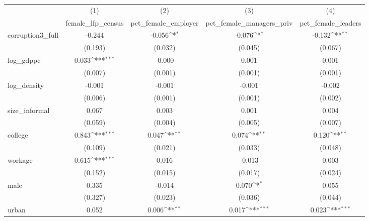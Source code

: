 {
\def\sym#1{\ifmmode^{#1}\else\(^{#1}\)\fi}
\begin{tabular}{l*{4}{c}}
\hline\hline
            &\multicolumn{1}{c}{(1)}&\multicolumn{1}{c}{(2)}&\multicolumn{1}{c}{(3)}&\multicolumn{1}{c}{(4)}\\
            &\multicolumn{1}{c}{female\_lfp\_census}&\multicolumn{1}{c}{pct\_female\_employer}&\multicolumn{1}{c}{pct\_female\_managers\_priv}&\multicolumn{1}{c}{pct\_female\_leaders}\\
\hline
corruption3\_full&      -0.244         &      -0.056\sym{*}  &      -0.076\sym{*}  &      -0.132\sym{**} \\
            &     (0.193)         &     (0.032)         &     (0.045)         &     (0.067)         \\
[1em]
log\_gdppc   &       0.033\sym{***}&      -0.000         &       0.001         &       0.001         \\
            &     (0.007)         &     (0.001)         &     (0.001)         &     (0.001)         \\
[1em]
log\_density &      -0.001         &      -0.001         &      -0.001         &      -0.002         \\
            &     (0.006)         &     (0.001)         &     (0.001)         &     (0.002)         \\
[1em]
size\_informal&       0.067         &       0.003         &       0.001         &       0.004         \\
            &     (0.059)         &     (0.004)         &     (0.005)         &     (0.007)         \\
[1em]
college     &       0.843\sym{***}&       0.047\sym{**} &       0.074\sym{**} &       0.120\sym{**} \\
            &     (0.109)         &     (0.021)         &     (0.033)         &     (0.048)         \\
[1em]
workage     &       0.615\sym{***}&       0.016         &      -0.013         &       0.003         \\
            &     (0.152)         &     (0.015)         &     (0.017)         &     (0.024)         \\
[1em]
male        &       0.335         &      -0.014         &       0.070\sym{*}  &       0.055         \\
            &     (0.327)         &     (0.023)         &     (0.036)         &     (0.044)         \\
[1em]
urban       &       0.052         &       0.006\sym{**} &       0.017\sym{***}&       0.023\sym{***}\\

\end{tabular}}
